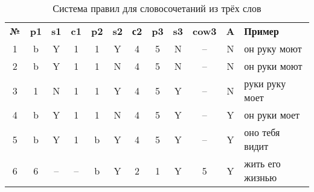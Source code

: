 \documentclass[main]{subfiles}
\begin{document}
\begin{longtable}[c]{|c|c|c|c|c|c|c|c|c|c|c|p{120px}|}
	\captionsetup{format=hang,labelsep = endash, singlelinecheck=false}
\caption{Система правил для словосочетаний из трёх слов}\label{tab2}\\
	\hline
	\textbf{№}&\textbf{p1} &\textbf{s1}&\textbf{c1}&\textbf{p2}&\textbf{s2}&\textbf{с2}&\textbf{p3}&\textbf{s3}&\textbf{cow3}&\textbf{A}&\textbf{Пример} \\ \hline
	1 &b  &Y  &1  &1  &Y  &4  &5  &N &--&N&он руку моют \\ \hline
	2&b&Y&1&1&N&4&5&N&--&N&он руки моют\\ \hline
	3&1&N&1&1&Y&4&5&Y&--&N&руки руку моет\\ \hline
	4&b&Y&1&1&N&4&5&Y&--&Y&он руки моет\\ \hline
	5&b&Y&1&b&Y&4&5&Y&--&Y& оно тебя видит\\ \hline
	6&6&--&--&b&Y&2&1&Y&5&Y&жить его жизнью \\ \hline
\end{longtable}
\end{document}
